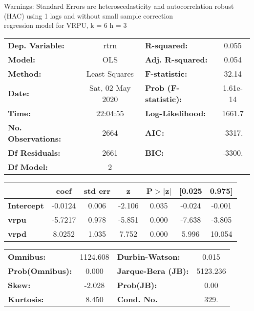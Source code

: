 Warnings: \newline
 [1] Standard Errors are heteroscedasticity and autocorrelation robust (HAC) using 1 lags and without small sample correction\\ 

regression model for VRPU, k = 6 h = 3\begin{center}
\begin{tabular}{lclc}
\toprule
\textbf{Dep. Variable:}    &       rtrn       & \textbf{  R-squared:         } &     0.055   \\
\textbf{Model:}            &       OLS        & \textbf{  Adj. R-squared:    } &     0.054   \\
\textbf{Method:}           &  Least Squares   & \textbf{  F-statistic:       } &     32.14   \\
\textbf{Date:}             & Sat, 02 May 2020 & \textbf{  Prob (F-statistic):} &  1.61e-14   \\
\textbf{Time:}             &     22:04:55     & \textbf{  Log-Likelihood:    } &    1661.7   \\
\textbf{No. Observations:} &        2664      & \textbf{  AIC:               } &    -3317.   \\
\textbf{Df Residuals:}     &        2661      & \textbf{  BIC:               } &    -3300.   \\
\textbf{Df Model:}         &           2      & \textbf{                     } &             \\
\bottomrule
\end{tabular}
\begin{tabular}{lcccccc}
                   & \textbf{coef} & \textbf{std err} & \textbf{z} & \textbf{P$> |$z$|$} & \textbf{[0.025} & \textbf{0.975]}  \\
\midrule
\textbf{Intercept} &      -0.0124  &        0.006     &    -2.106  &         0.035        &       -0.024    &       -0.001     \\
\textbf{vrpu}      &      -5.7217  &        0.978     &    -5.851  &         0.000        &       -7.638    &       -3.805     \\
\textbf{vrpd}      &       8.0252  &        1.035     &     7.752  &         0.000        &        5.996    &       10.054     \\
\bottomrule
\end{tabular}
\begin{tabular}{lclc}
\textbf{Omnibus:}       & 1124.608 & \textbf{  Durbin-Watson:     } &    0.015  \\
\textbf{Prob(Omnibus):} &   0.000  & \textbf{  Jarque-Bera (JB):  } & 5123.236  \\
\textbf{Skew:}          &  -2.028  & \textbf{  Prob(JB):          } &     0.00  \\
\textbf{Kurtosis:}      &   8.450  & \textbf{  Cond. No.          } &     329.  \\
\bottomrule
\end{tabular}
\end{center}

